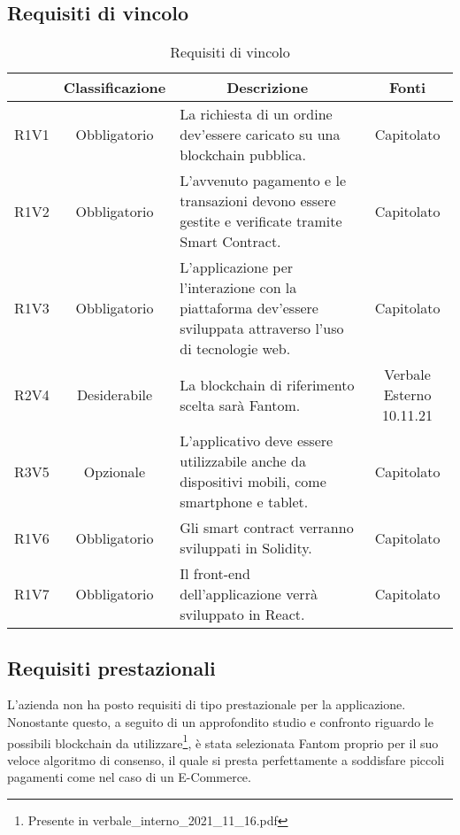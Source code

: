 \subsection{Requisiti di vincolo} \label{subsection:requisiti_vincolo}
\begin{table}[H]
    \centering
    \renewcommand{\arraystretch}{1.8}
    \begin{tabular}{c | c | p{6cm} | c}
        \rowcolor[HTML]{125E28}
        \multicolumn{1}{c}{\color[HTML]{FFFFFF} \textbf{Codice}} & 
		\multicolumn{1}{c}{\color[HTML]{FFFFFF} \textbf{Classificazione}} & 
		\multicolumn{1}{c}{\color[HTML]{FFFFFF} \textbf{Descrizione}} & 
		\multicolumn{1}{c}{\color[HTML]{FFFFFF} \textbf{Fonti}} \\
        \hline
		R1V1 & Obbligatorio & La richiesta di un ordine dev'essere caricato su una blockchain pubblica. & Capitolato \\
        R1V2 & Obbligatorio & L'avvenuto pagamento e le transazioni devono essere gestite e verificate tramite Smart Contract. & Capitolato \\
        R1V3 & Obbligatorio & L'applicazione per l'interazione con la piattaforma dev'essere sviluppata attraverso l'uso di tecnologie web. & Capitolato \\ 
        R2V4 & Desiderabile & La blockchain di riferimento scelta sarà Fantom. & Verbale Esterno 10.11.21 \\
        R3V5 & Opzionale & L'applicativo deve essere utilizzabile anche da dispositivi mobili, come smartphone e tablet. & Capitolato \\                       
        R1V6 & Obbligatorio & Gli smart contract verranno sviluppati in Solidity. & Capitolato \\
        R1V7 & Obbligatorio & Il front-end dell'applicazione verrà sviluppato in React. & Capitolato \\ 
    \end{tabular}
    \caption{Requisiti di vincolo}
\end{table}

\subsection{Requisiti prestazionali} \label{subsection:requisiti_prestazionali}

L'azienda non ha posto requisiti di tipo prestazionale per la applicazione.
Nonostante questo, a seguito di un approfondito studio e confronto riguardo le possibili blockchain da utilizzare\footnote{Presente in verbale\_interno\_2021\_11\_16.pdf}, 
è stata selezionata Fantom proprio per il suo veloce algoritmo di consenso, il quale si presta perfettamente a soddisfare piccoli pagamenti 
come nel caso di un E-Commerce.

\clearpage
